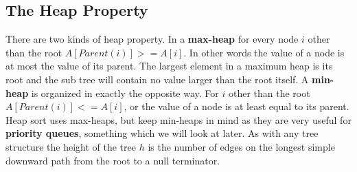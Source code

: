 \documentclass[10pt,a4paper]{article}
\begin{document}
\subsection{The Heap Property}
There are two kinds of heap property. In a {\bf max-heap} for every node $i$ other than the root $A[Parent(i)]>= A[i]$. In other words the value of a node is at most the value of its parent. The largest element in a maximum heap is its root and the sub tree will contain no value larger than the root itself. A {\bf min-heap} is organized in exactly the opposite way. For $i$ other than the root $A[Parent(i)]<= A[i]$, or the value of a node is at least equal to its parent. Heap sort uses max-heaps, but keep min-heaps in mind as they are very useful for {\bf priority queues}, something which we will look at later. As with any tree structure the height of the tree $h$ is the number of edges on the longest simple downward path from the root to a null terminator. 
\end{document}
